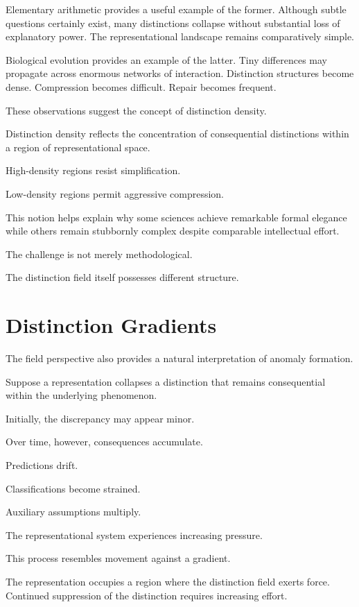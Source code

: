 \documentclass[11pt,oneside,openany]{book}
\begin{document}
Elementary arithmetic provides a useful example of the former. Although subtle questions certainly exist, many distinctions collapse without substantial loss of explanatory power. The representational landscape remains comparatively simple.

Biological evolution provides an example of the latter. Tiny differences may propagate across enormous networks of interaction. Distinction structures become dense. Compression becomes difficult. Repair becomes frequent.

These observations suggest the concept of distinction density.

Distinction density reflects the concentration of consequential distinctions within a region of representational space.

High-density regions resist simplification.

Low-density regions permit aggressive compression.

This notion helps explain why some sciences achieve remarkable formal elegance while others remain stubbornly complex despite comparable intellectual effort.

The challenge is not merely methodological.

The distinction field itself possesses different structure.

\section{Distinction Gradients}

The field perspective also provides a natural interpretation of anomaly formation.

Suppose a representation collapses a distinction that remains consequential within the underlying phenomenon.

Initially, the discrepancy may appear minor.

Over time, however, consequences accumulate.

Predictions drift.

Classifications become strained.

Auxiliary assumptions multiply.

The representational system experiences increasing pressure.

This process resembles movement against a gradient.

The representation occupies a region where the distinction field exerts force. Continued suppression of the distinction requires increasing effort.
\end{document}
